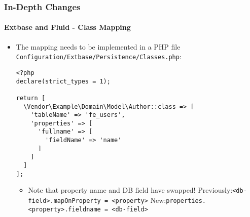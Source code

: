 
\begin{frame}[fragile]
	\frametitle{In-Depth Changes}
	\framesubtitle{Extbase and Fluid - Class Mapping}

	\lstset{basicstyle=\tiny\ttfamily}

	\begin{itemize}
		\item The mapping needs to be implemented in a PHP file \texttt{Configuration/Extbase/Persistence/Classes.php}:
\begin{lstlisting}
<?php
declare(strict_types = 1);

return [
  \Vendor\Example\Domain\Model\Author::class => [
    'tableName' => 'fe_users',
    'properties' => [
      'fullname' => [
        'fieldName' => 'name'
      ]
    ]
  ]
];
\end{lstlisting}

		\begin{itemize}\smaller
			\item[\ding{228}] Note that property name and DB field have swapped!\newline
				Previously:\tabto{1.6cm}\texttt{<db-field>.mapOnProperty = <property>}\newline
				New:\tabto{1.6cm}\texttt{properties.<property>.fieldname = <db-field>}
		\end{itemize}\normalsize

	\end{itemize}

\end{frame}


